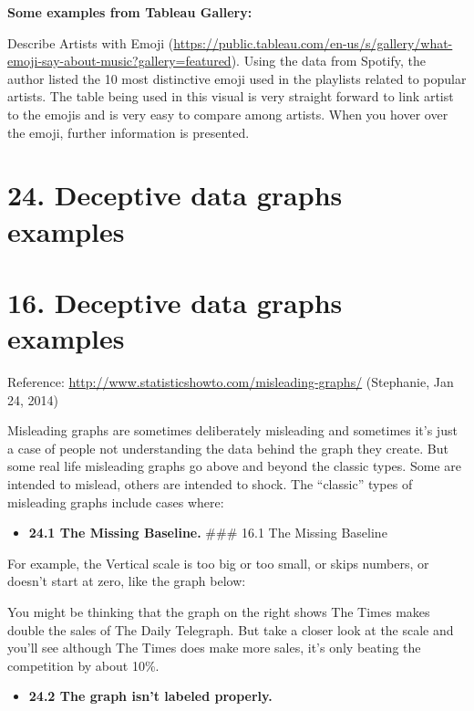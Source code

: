 \documentclass[]{book}
\providecommand{\tightlist}{%
  \setlength{\itemsep}{0pt}\setlength{\parskip}{0pt}}
\theoremstyle{definition}
\theoremstyle{definition}
\theoremstyle{definition}
\theoremstyle{remark}
\begin{document}
\textbf{Some examples from Tableau Gallery:}

Describe Artists with Emoji
(\url{https://public.tableau.com/en-us/s/gallery/what-emoji-say-about-music?gallery=featured}).
Using the data from Spotify, the author listed the 10 most distinctive
emoji used in the playlists related to popular artists. The table being
used in this visual is very straight forward to link artist to the
emojis and is very easy to compare among artists. When you hover over
the emoji, further information is presented.

\section{24. Deceptive data graphs
examples}\label{deceptive-data-graphs-examples}

\section{16. Deceptive data graphs
examples}\label{deceptive-data-graphs-examples-1}

Reference: \url{http://www.statisticshowto.com/misleading-graphs/}
(Stephanie, Jan 24, 2014)

Misleading graphs are sometimes deliberately misleading and sometimes
it's just a case of people not understanding the data behind the graph
they create. But some real life misleading graphs go above and beyond
the classic types. Some are intended to mislead, others are intended to
shock. The ``classic'' types of misleading graphs include cases where:

\begin{itemize}
\tightlist
\item
  \textbf{24.1 The Missing Baseline.} \#\#\# 16.1 The Missing Baseline
\end{itemize}

For example, the Vertical scale is too big or too small, or skips
numbers, or doesn't start at zero, like the graph below:

You might be thinking that the graph on the right shows The Times makes
double the sales of The Daily Telegraph. But take a closer look at the
scale and you'll see although The Times does make more sales, it's only
beating the competition by about 10\%.

\begin{itemize}
\tightlist
\item
  \textbf{24.2 The graph isn't labeled properly.}
\end{itemize}
\end{document}
